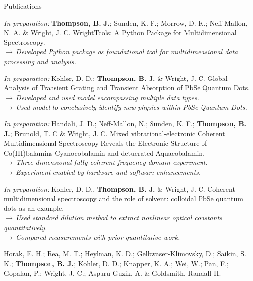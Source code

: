 \documentclass{resume}  %
\begin{document}
\clearpage

\begin{rSection}{Publications}
  \begin{etaremune}[leftmargin = 1.75em]
    \item \textit{In preparation:}
      \textbf{Thompson, B. J.}; Sunden, K. F.; Morrow, D. K.; Neff-Mallon, N. A.
      \& Wright, J. C.
      WrightTools: A Python Package for Multidimensional Spectroscopy. \\
      $\rightarrow\,$\textit{Developed Python package as foundational tool for multidimensional
        data processing and analysis.}
    \item \textit{In preparation:}
      Kohler, D. D.; \textbf{Thompson, B. J.} \& Wright, J. C.
      Global Analysis of Transient Grating and Transient Absorption of PbSe Quantum Dots. \\
      $\rightarrow\,$\textit{Developed and used model encompassing multiple data types.} \\
      $\rightarrow\,$\textit{Used model to conclusively identify new physics within PbSe Quantum
        Dots.}
    \item \textit{In preparation:}
      Handali, J. D.; Neff-Mallon, N.; Sunden, K. F.; \textbf{Thompson, B. J.}; Brunold, T. C
      \& Wright, J. C.
      Mixed vibrational-electronic Coherent Multidimensional Spectroscopy Reveals the Electronic
      Structure of Co(III)balamins Cyanocobalamin and detuerated Aquacobalamin. \\
      $\rightarrow\,$\textit{Three dimensional fully coherent frequency domain experiment.} \\
      $\rightarrow\,$\textit{Experiment enabled by hardware and software enhancements.}
    \item \textit{In preparation:}
      Kohler, D. D., \textbf{Thompson, B. J.} \& Wright, J. C.
      Coherent multidimensional spectroscopy and the role of solvent: colloidal PbSe quantum dots
      as an example. \\
      $\rightarrow\,$\textit{Used standard dilution method to extract nonlinear optical constants
        quantitatively.} \\
      $\rightarrow\,$\textit{Compared measurements with prior quantitative work.}
    \item Horak, E. H.; Rea, M. T.; Heylman, K. D.; Gelbwaser-Klimovsky, D.; Saikin, S. K.;
      \textbf{Thompson, B. J.}; Kohler, D. D.; Knapper, K. A.; Wei, W.; Pan, F.; Gopalan, P.;
      Wright, J. C.; Aspuru-Guzik, A. \& Goldsmith, Randall H.

\end{etaremune}
\end{rSection}
\end{document}
